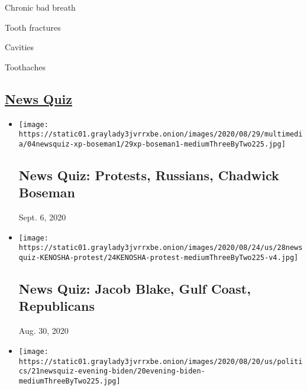 Chronic bad breath

Tooth fractures

Cavities

Toothaches

\hypertarget{news-quiz}{%
\subsection{\texorpdfstring{\href{https://www.nytimes3xbfgragh.onion/spotlight/news-quiz}{News
Quiz}}{News Quiz}}\label{news-quiz}}

\begin{itemize}
\item
  \href{https://www.nytimes3xbfgragh.onion/interactive/2020/09/04/briefing/protests-russians-chadwick-boseman.html}{}

  \texttt{[image: https://static01.graylady3jvrrxbe.onion/images/2020/08/29/multimedia/04newsquiz-xp-boseman1/29xp-boseman1-mediumThreeByTwo225.jpg]}

  \hypertarget{news-quiz-protests-russians-chadwick-boseman}{%
  \subsection{News Quiz: Protests, Russians, Chadwick
  Boseman}\label{news-quiz-protests-russians-chadwick-boseman}}

  Sept. 6, 2020
\item
  \href{https://www.nytimes3xbfgragh.onion/interactive/2020/08/28/briefing/jacob-blake-gulf-coast-republicans-news-quiz.html}{}

  \texttt{[image: https://static01.graylady3jvrrxbe.onion/images/2020/08/24/us/28newsquiz-KENOSHA-protest/24KENOSHA-protest-mediumThreeByTwo225-v4.jpg]}

  \hypertarget{news-quiz-jacob-blake-gulf-coast-republicans}{%
  \subsection{News Quiz: Jacob Blake, Gulf Coast,
  Republicans}\label{news-quiz-jacob-blake-gulf-coast-republicans}}

  Aug. 30, 2020
\item
  \href{https://www.nytimes3xbfgragh.onion/interactive/2020/08/21/briefing/democrats-russia-herd-immunity-news-quiz.html}{}

  \texttt{[image: https://static01.graylady3jvrrxbe.onion/images/2020/08/20/us/politics/21newsquiz-evening-biden/20evening-biden-mediumThreeByTwo225.jpg]}


\end{itemize}
